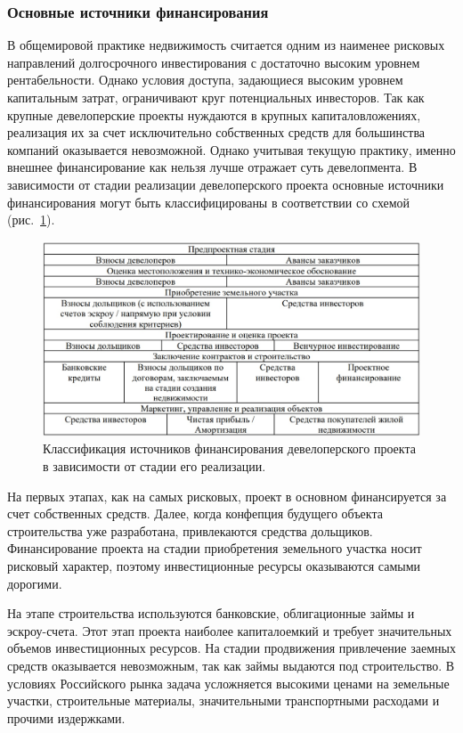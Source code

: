 \documentclass[12pt,a4paper]{article} %
\begin{document}
\subsubsection{Основные источники финансирования }

В общемировой практике недвижимость считается одним из наименее рисковых направлений долгосрочного инвестирования с достаточно высоким уровнем рентабельности. Однако условия доступа, задающиеся высоким уровнем капитальным затрат, ограничивают круг потенциальных инвесторов. Так как крупные девелоперские проекты нуждаются в крупных капиталовложениях, реализация их за счет исключительно собственных средств для большинства компаний оказывается невозможной. Однако учитывая текущую практику, именно внешнее финансирование как нельзя лучше отражает суть девелопмента.
В зависимости от стадии реализации девелоперского проекта основные источники финансирования могут быть классифицированы в соответствии со схемой (рис.~\ref{fig:fin_source_clas}). 

\begin{figure}[h]
	
	\centering
	
	\includegraphics[width=0.7\linewidth]{fin_source_clas.jpg}
	
	\caption{Классификация источников финансирования девелоперского проекта в зависимости от стадии его реализации.}
	
	\label{fig:fin_source_clas}
	
\end{figure}

На первых этапах, как на самых рисковых, проект в основном финансируется за счет собственных средств. Далее, когда конфепция будущего объекта строительства уже разработана, привлекаются средства дольщиков. Финансирование проекта на стадии приобретения земельного участка носит рисковый характер, поэтому инвестиционные ресурсы оказываются самыми дорогими.

На этапе строительства используются банковские, облигационные займы и эскроу-счета. Этот этап проекта наиболее капиталоемкий  и требует значительных объемов инвестиционных ресурсов. На стадии продвижения привлечение заемных средств оказывается невозможным, так как займы выдаются под строительство.
В условиях Российского рынка задача усложняется высокими ценами на земельные участки, строительные материалы, значительными транспортными расходами и прочими издержками.
\end{document}
